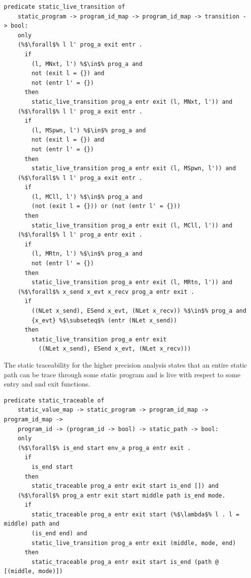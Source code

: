 \documentclass{article}
\begin{document}
\begin{lstlisting}[language=logic, escapechar=\%]
  predicate static_live_transition of
    static_program -> program_id_map -> program_id_map -> transition -> bool:
    only
    (%$\forall$% l l' prog_a exit entr . 
      if
        (l, MNxt, l') %$\in$% prog_a and
        not (exit l = {}) and
        not (entr l' = {})
      then
        static_live_transition prog_a entr exit (l, MNxt, l')) and
    (%$\forall$% l l' prog_a exit entr .
      if
        (l, MSpwn, l') %$\in$% prog_a and 
        not (exit l = {}) and
        not (entr l' = {})
      then
        static_live_transition prog_a entr exit (l, MSpwn, l')) and
    (%$\forall$% l l' prog_a exit entr .
      if
        (l, MCll, l') %$\in$% prog_a and
        (not (exit l = {})) or (not (entr l' = {}))
      then
        static_live_transition prog_a entr exit (l, MCll, l')) and
    (%$\forall$% l l' prog_a entr exit .
      if
        (l, MRtn, l') %$\in$% prog_a and
        not (entr l' = {})
      then
        static_live_transition prog_a entr exit (l, MRtn, l')) and
    (%$\forall$% x_send x_evt x_recv prog_a entr exit .
      if
        ((NLet x_send), ESend x_evt, (NLet x_recv)) %$\in$% prog_a and 
        {x_evt} %$\subseteq$% (entr (NLet x_send))
      then
        static_live_transition prog_a entr exit
          ((NLet x_send), ESend x_evt, (NLet x_recv)))
  \end{lstlisting}

The static traceability for the higher precision analysis states
that an entire static path can be trace through some static program and
is live with respect to some entry and and exit functions.

\begin{lstlisting}[language=logic, escapechar=\%]
  predicate static_traceable of
    static_value_map -> static_program -> program_id_map -> program_id_map ->
    program_id -> (program_id -> bool) -> static_path -> bool:
    only
    (%$\forall$% is_end start env_a prog_a entr exit .
      if
        is_end start
      then
        static_traceable prog_a entr exit start is_end []) and
    (%$\forall$% prog_a entr exit start middle path is_end mode. 
      if
        static_traceable prog_a entr exit start (%$\lambda$% l . l = middle) path and 
        (is_end end) and
        static_live_transition prog_a entr exit (middle, mode, end) 
      then
        static_traceable prog_a entr exit start is_end (path @ [(middle, mode)])
  \end{lstlisting}
\end{document}
